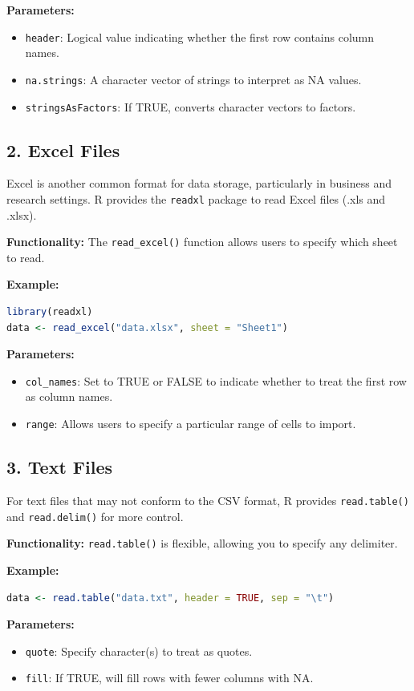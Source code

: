 \documentclass[10pt]{book}
\begin{document}
\textbf{Parameters:}
\begin{itemize}
    \item \texttt{header}: Logical value indicating whether the first row contains column names.
    \item \texttt{na.strings}: A character vector of strings to interpret as NA values.
    \item \texttt{stringsAsFactors}: If TRUE, converts character vectors to factors.
\end{itemize}

\subsection{2. Excel Files}
Excel is another common format for data storage, particularly in business and research settings. R provides the \texttt{readxl} package to read Excel files (.xls and .xlsx).

\textbf{Functionality:} The \texttt{read\_excel()} function allows users to specify which sheet to read.

\textbf{Example:}
\begin{lstlisting}[language=R]
library(readxl)
data <- read_excel("data.xlsx", sheet = "Sheet1")
\end{lstlisting}

\textbf{Parameters:}
\begin{itemize}
    \item \texttt{col\_names}: Set to TRUE or FALSE to indicate whether to treat the first row as column names.
    \item \texttt{range}: Allows users to specify a particular range of cells to import.
\end{itemize}

\subsection{3. Text Files}
For text files that may not conform to the CSV format, R provides \texttt{read.table()} and \texttt{read.delim()} for more control.

\textbf{Functionality:} \texttt{read.table()} is flexible, allowing you to specify any delimiter.

\textbf{Example:}
\begin{lstlisting}[language=R]
data <- read.table("data.txt", header = TRUE, sep = "\t")
\end{lstlisting}

\textbf{Parameters:}
\begin{itemize}
    \item \texttt{quote}: Specify character(s) to treat as quotes.
    \item \texttt{fill}: If TRUE, will fill rows with fewer columns with NA.
\end{itemize}
\end{document}

